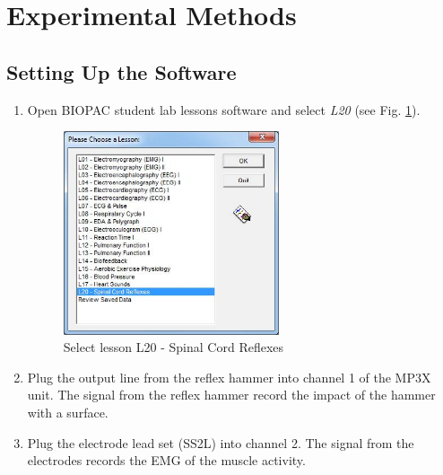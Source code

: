 \documentclass{article}
\begin{document}
\section*{Experimental Methods}
\subsection*{Setting Up the Software}
\begin{enumerate}
	\item Open BIOPAC student lab lessons software and select \textit{L20} (see Fig. \ref{lesson}).
	
		\begin{figure}[h]
		\centering
		\includegraphics[width=0.6\textwidth]{../images/EMG_II_3.jpg}	
		\caption{Select lesson L20 - Spinal Cord Reflexes}
		\label{lesson}
		\end{figure}
	\item Plug the output line from the reflex hammer into channel 1 of the MP3X unit. The signal from the reflex hammer record the impact of the hammer with a surface.
	\item Plug the electrode lead set (SS2L) into channel 2. The signal from the electrodes records the EMG of the muscle activity.
\end{enumerate}
\end{document}

